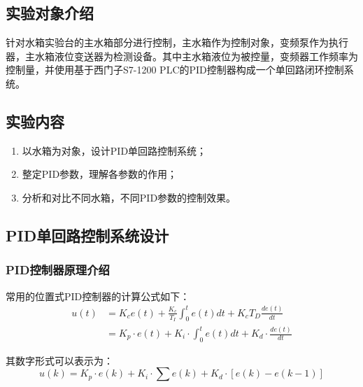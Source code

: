 \documentclass[UTF8]{article}
\begin{document}
\subsection{实验对象介绍}

针对水箱实验台的主水箱部分进行控制，主水箱作为控制对象，变频泵作为执行器，主水箱液位变送器为检测设备。其中主水箱液位为被控量，变频器工作频率为控制量，并使用基于西门子S7-1200 PLC的PID控制器构成一个单回路闭环控制系统。



\subsection{实验内容}
\begin{enumerate}
	\item 以水箱为对象，设计PID单回路控制系统；
	\item 整定PID参数，理解各参数的作用；
	\item 分析和对比不同水箱，不同PID参数的控制效果。
\end{enumerate}

\subsection{PID单回路控制系统设计}

\subsubsection{PID控制器原理介绍}
常用的位置式PID控制器的计算公式如下：
\begin{align*}
	u(t) &= K_ce(t) + \frac{K_c}{T_I}\int_0^t e(t)dt + K_cT_D\frac{de(t)}{dt} \\
	&= K_p \cdot e(t) + K_i \cdot \int_0^t e(t)dt + K_d \cdot \frac{de(t)}{dt}
\end{align*}

其数字形式可以表示为：
\begin{equation*}
	u(k) = K_p \cdot e(k) + K_i \cdot \sum e(k) + K_d \cdot [e(k) - e(k-1)]
\end{equation*}
\end{document}
